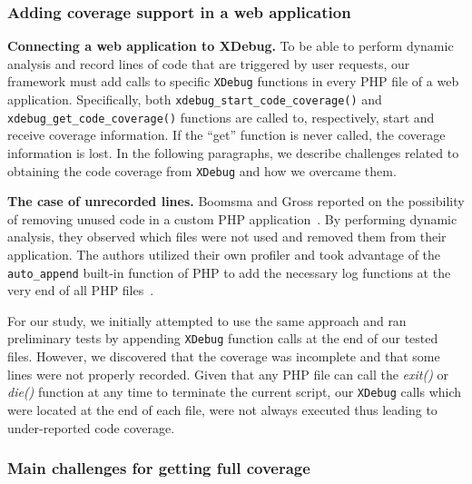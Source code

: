 \subsubsection{Adding coverage support in a web application}

\vspace{1ex}
\noindent\textbf{Connecting a web application to XDebug.}
To be able to perform dynamic analysis and record lines of code
that are triggered by user requests, our framework must add calls
to specific \texttt{XDebug} functions in every PHP file of a web
application. Specifically, both \texttt{xdebug\_start\_code\_coverage()} and
\texttt{xdebug\_get\_code\_coverage()} functions are called to, respectively,
start and receive coverage information. If the ``get'' function is never
called, the coverage information is lost. In the following paragraphs, we
describe challenges related to obtaining the code coverage from \texttt{XDebug}
and how we overcame them.

\vspace{1ex}
\noindent\textbf{The case of unrecorded lines.}
Boomsma and Gross reported on the possibility of removing unused code in a
custom PHP application~\cite{boomsma2012Dead}. By performing dynamic
analysis, they observed which files were not used and removed
them from their application. The authors utilized their own profiler and took
advantage of the \texttt{auto\_append} built-in function of PHP to add
the necessary log functions at the very end of all PHP files~\cite{autoappend}.

For our study, we initially attempted to use the same approach and ran
preliminary tests by appending \texttt{XDebug} function calls at the end
of our tested files. However, we discovered that the coverage was
incomplete and that some lines were not properly recorded. Given that any
PHP file can call the \textit{exit()} or \textit{die()} function at any
time to terminate the current script, our \texttt{XDebug} calls which were
located at the end of each file, were not always executed thus leading to
under-reported code coverage.




\subsubsection{Main challenges for getting full coverage}
\label{subsubsec:challenges}

